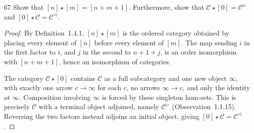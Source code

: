 \begin{exercise}{67}
Show that $[n]\star[m]=[n+m+1]$. Furthermore, show that $\mathcal C\star[0]=\mathcal C^{\rhd}$ and
$[0]\star\mathcal C=\mathcal C^{\lhd}$.

\begin{proof}
By Definition~1.4.1, $[n]\star[m]$ is the ordered
category obtained by placing every element of $[n]$
before every element of $[m]$.
The map sending $i$ in the first factor to $i$, and
$j$ in the second to $n+1+j$, is an order isomorphism
with $[n+m+1]$, hence an isomorphism of categories.

The category $\mathcal C\star[0]$ contains $\mathcal C$
as a full subcategory and one new object $\infty$,
with exactly one arrow $c\to\infty$ for each $c$,
no arrows $\infty\to c$, and only the identity at
$\infty$.
Composition involving $\infty$ is forced by these
singleton hom-sets.
This is precisely $\mathcal C$ with a terminal object
adjoined, namely $\mathcal C^{\rhd}$
(Observation~1.1.15).
Reversing the two factors instead adjoins an initial
object, giving $[0]\star\mathcal C=\mathcal C^{\lhd}$.
\end{proof}
\end{exercise}
